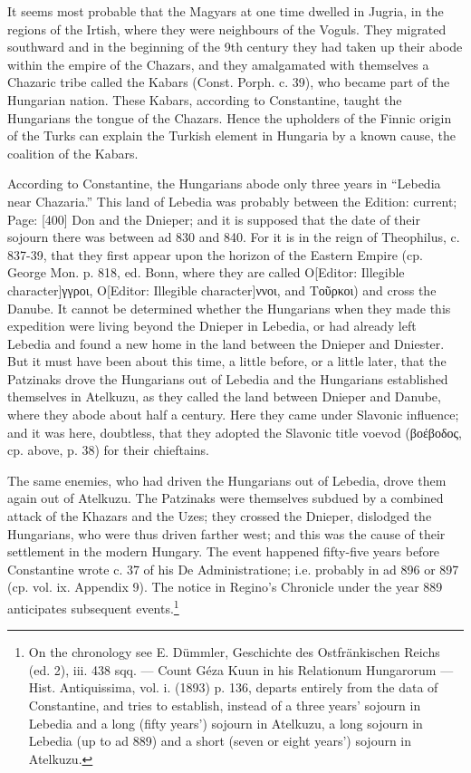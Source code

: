 It seems most probable that the Magyars at one time dwelled in Jugria, in the regions of the Irtish, where they were neighbours of the Voguls. They migrated southward and in the beginning of the 9th century they had taken up their abode within the empire of the Chazars, and they amalgamated with themselves a Chazaric tribe called the Kabars (Const. Porph. c. 39), who became part of the Hungarian nation. These Kabars, according to Constantine, taught the Hungarians the tongue of the Chazars. Hence the upholders of the Finnic origin of the Turks can explain the Turkish element in Hungaria by a known cause, the coalition of the Kabars.

According to Constantine, the Hungarians abode only three years in \texthebrew{“}Lebedia near Chazaria.\texthebrew{}” This land of Lebedia was probably between the Edition: current; Page: [400] Don and the Dnieper; and it is supposed that the date of their sojourn there was between ad 830 and 840. For it is in the reign of Theophilus, c. 837-39, that they first appear upon the horizon of the Eastern Empire (cp. George Mon. p. 818, ed. Bonn, where they are called \textgreek{Ο}[Editor: Illegible character]\textgreek{γγροι, Ο}[Editor: Illegible character]\textgreek{ννοι}, and \textgreek{Το\texthebrew{ῦ}ρκοι}) and cross the Danube. It cannot be determined whether the Hungarians when they made this expedition were living beyond the Dnieper in Lebedia, or had already left Lebedia and found a new home in the land between the Dnieper and Dniester. But it must have been about this time, a little before, or a little later, that the Patzinaks drove the Hungarians out of Lebedia and the Hungarians established themselves in Atelkuzu, as they called the land between Dnieper and Danube, where they abode about half a century. Here they came under Slavonic influence; and it was here, doubtless, that they adopted the Slavonic title voevod (\textgreek{βοέβοδος}, cp. above, p. 38) for their chieftains.

The same enemies, who had driven the Hungarians out of Lebedia, drove them again out of Atelkuzu. The Patzinaks were themselves subdued by a combined attack of the Khazars and the Uzes; they crossed the Dnieper, dislodged the Hungarians, who were thus driven farther west; and this was the cause of their settlement in the modern Hungary. The event happened fifty-five years before Constantine wrote c. 37 of his De Administratione; i.e. probably in ad 896 or 897 (cp. vol. ix. Appendix 9). The notice in Regino\texthebrew{}’s Chronicle under the year 889 anticipates subsequent events.\footnote{On the chronology see E. Dümmler, Geschichte des Ostfränkischen Reichs (ed. 2), iii. 438 sqq. \texthebrew{—} Count Géza Kuun in his Relationum Hungarorum \texthebrew{—} Hist. Antiquissima, vol. i. (1893) p. 136, departs entirely from the data of Constantine, and tries to establish, instead of a three years\texthebrew{}’ sojourn in Lebedia and a long (fifty years\texthebrew{}’) sojourn in Atelkuzu, a long sojourn in Lebedia (up to ad 889) and a short (seven or eight years\texthebrew{}’) sojourn in Atelkuzu.}

